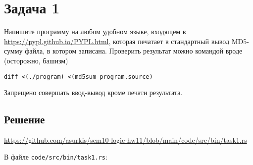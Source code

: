 \section{Задача 1}
Напишите программу на любом удобном языке,
входящем в \url{https://pypl.github.io/PYPL.html},
которая печатает в стандартный вывод MD5-сумму файла,
в котором записана.
Проверить результат можно командой вроде (осторожно, башизм)
\begin{verbatim}
diff <(./program) <(md5sum program.source)
\end{verbatim}
Запрещено совершать ввод-вывод кроме печати результата.

\subsection{Решение}
\url{https://github.com/asurkis/sem10-logic-hw11/blob/main/code/src/bin/task1.rs}

В файле \texttt{code/src/bin/task1.rs}:

\inputminted{rust}{code/src/bin/task1.rs}
